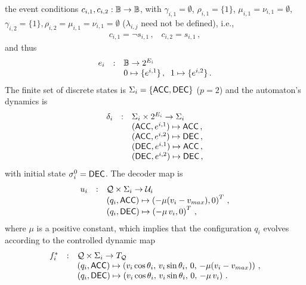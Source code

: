 \documentclass[journal, onecolumn, 12pt]{styles/IEEEtran}
\begin{document}
the event conditions ${c_{i,1}, c_{i,2} : \Bbb{B} \rightarrow \Bbb{B}}$,
with $\gamma_{i,1} = \emptyset$, $\rho_{i,1} = \{1\}$, $\mu_{i,1} =
\nu_{i,1} = \emptyset$, $\gamma_{i,2} = \{1\}, \rho_{i,2} = \mu_{i,1}
= \nu_{i,1} = \emptyset$ ($\lambda_{i,j}$ need not be defined), i.e., 
\begin{equation*}
\begin{array}{rcl}
c_{i,1} = \neg s_{i,1} \, , \;\;\; c_{i,2} = s_{i,1} \, , 
\end{array}
\end{equation*}
and thus
\begin{equation*}
\begin{array}{rcl}
e_i & : & \Bbb{B} \rightarrow 2^{E_i} \\
& & 0 \mapsto \{ e^{i,1} \} \, , \;\;  1 \mapsto \{ e^{i,2} \} \, .
\end{array}
\end{equation*}
The finite set of discrete states is $\Sigma_i=\{ \macc, \mdec \}$ ($p=2$) and the automaton's dynamics is 
\begin{equation*}
\begin{array}{rcl}
\delta_i & : & \Sigma_i \times 2^{E_i} \rightarrow \Sigma_i  \\
& & (\macc, e^{i,1}) \mapsto \macc \, , \\
& & (\macc, e^{i,2}) \mapsto \mdec \, , \\
& & (\mdec, e^{i,1}) \mapsto \macc \, , \\
& & (\mdec, e^{i,2}) \mapsto \mdec \, ,
\end{array}
\end{equation*}
with initial state $\sigma_i^0 = \mdec$. The decoder map is 
\begin{equation*}
\begin{array}{rcl}
u_i  & : & \Q \times \Sigma_i \rightarrow \mathcal{U}_i \\
& & (q_i, \macc) \mapsto 
\left( - \mu (v_i - v_{max}), 0 \right)^T \, , \\
& & (q_i, \mdec) \mapsto 
\left( - \mu \, v_i, 0 \right)^T \, ,
\end{array}
\end{equation*}
where $\mu$ is a positive constant, which implies that the configuration $q_i$ evolves according to the controlled  dynamic map
\begin{equation*}
\begin{array}{rcl}
f^*_i & : & \mathcal{Q} \times \Sigma_i \rightarrow T_\mathcal{Q} \\
& & (q_i, \macc) \mapsto 
\left(v_i \cos \theta_i, \, v_i \sin \theta_i, \, 0 , \, - \mu (v_i - v_{max}) \right)  \, , \\
& & (q_i, \mdec) \mapsto 
\left(v_i \cos \theta_i, \, v_i \sin \theta_i, \, 0 , \, - \mu \, v_i \right)  \, .
\end{array} 
\end{equation*}
\end{document}
